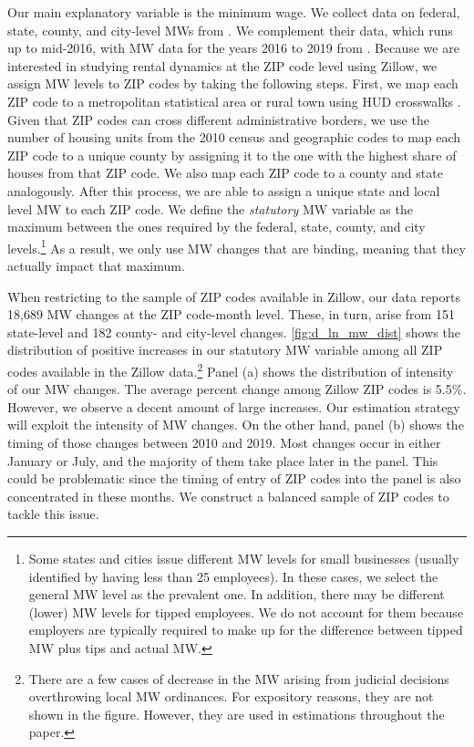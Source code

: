 Our main explanatory variable is the minimum wage. We collect data on federal, state, 
county, and city-level MWs from \textcite{VaghulZipperer2016}. We complement their data,
which runs up to mid-2016, with MW data for the years 2016 to 2019 from 
\textcite{BerkeleyLaborCenter}. Because we are interested in studying rental dynamics at 
the ZIP code level using Zillow, we assign MW levels to ZIP codes by taking the following steps.
First, we map each ZIP code to a metropolitan statistical area or rural town using HUD 
crosswalks \parencite{hudCrosswalks}. Given that ZIP codes can cross different administrative
borders, we use the number of housing units from the 2010 census and geographic codes to map 
each ZIP code to a unique county by assigning it to the one with the highest share of houses 
from that ZIP code. We also map each ZIP code to a county and state analogously. After this 
process, we are able to assign a unique state and local level MW to each ZIP code. We define 
the \textit{statutory} MW variable as the maximum between the ones required by the federal, 
state, county, and city levels.\footnote{Some states and cities issue different MW levels 
	for small businesses (usually identified by having less than 25 employees). In these 
	cases, we select the general MW level as the prevalent one. In addition, there may be 
	different (lower) MW levels for tipped employees. We do not account for them because 
	employers are typically required to make up for the difference between tipped MW plus 
	tips and actual MW.}
As a result, we only use MW changes that are binding, meaning that they actually impact 
that maximum.

When restricting to the sample of ZIP codes available in Zillow, our data reports 18,689 
MW changes at the ZIP code-month level. These, in turn, arise from 151 state-level and 182 
county- and city-level changes. \autoref{fig:d_ln_mw_dist} shows the distribution of 
positive increases in our statutory MW variable among all ZIP codes available in the 
Zillow data.\footnote{There are a few cases of decrease in the MW arising from judicial 
	decisions overthrowing local MW ordinances. For expository reasons, they are not shown 
	in the figure. However, they are used in estimations throughout the paper.}
Panel (a) shows the distribution of intensity of our MW changes. The average percent 
change among Zillow ZIP codes is 5.5\%. %
However, we observe a decent amount of large increases. Our estimation strategy will
exploit the intensity of MW changes. On the other hand, panel (b) shows the timing of 
those changes between 2010 and 2019. Most changes occur in either January or July, 
and the majority of them take place later in the panel. This could be problematic since
the timing of entry of ZIP codes into the panel is also concentrated in these months. We 
construct a balanced sample of ZIP codes to tackle this issue.

